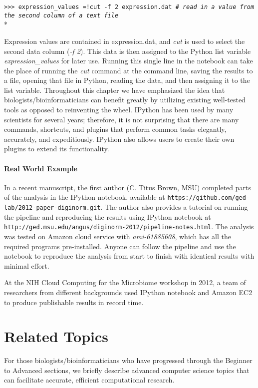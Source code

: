 \documentclass[ChapterTOCs,krantz2]{krantz} %
\begin{document}
\texttt{>>> expression\_values =!cut -f 2 expression.dat \emph{\# read in a
value from the second column of a text file}}\\*

Expression values are contained in expression.dat, and 
\emph{cut} is used to select the second data
column (\emph{-f 2}).  This data is then assigned to the Python list variable
\emph{expression\_values} for later use.  Running this single line in
the notebook can take the place of running the \emph{cut} command at the command line,
saving the results to a file, opening that file in Python, reading the data,
and then assigning it to the list variable.  Throughout this chapter we have
emphasized the idea that biologists/bioinformaticians can benefit greatly by
utilizing existing well-tested tools as opposed to reinventing the wheel.
IPython has been used by many scientists for several years; therefore, it is
not surprising that there are many commands, shortcuts, and plugins that
perform common tasks elegantly, accurately, and expeditiously.  
IPython also allows users to
create their own plugins to extend its functionality.

\paragraph{Real World Example}

In a recent manuscript, the first author (C. Titus Brown, MSU) completed parts
of the analysis in the IPython notebook, available at
\texttt{https://github.com/ged-lab/2012-paper-diginorm.git}. The author also
provides a tutorial on running the pipeline and reproducing the
results using IPython notebook at
\texttt{http://ged.msu.edu/angus/diginorm-2012/pipeline-notes.html}. 
The analysis was tested on Amazon cloud service with
\emph{ami-61885608}, which has all the required programs pre-installed. Anyone
can follow the pipeline and use the notebook to reproduce the
analysis from start to finish with identical results with minimal effort.

At the NIH Cloud Computing for the Microbiome workshop in 2012, a 
team of researchers from different backgrounds used IPython notebook 
and Amazon EC2 to produce publishable results in record time\cite{RaganKelley2012}.

\section{Related Topics}

For those biologists/bioinformaticians who have progressed through the Beginner
to Advanced sections, we briefly describe advanced computer science topics 
that can facilitate accurate, efficient computational research.
\end{document}
